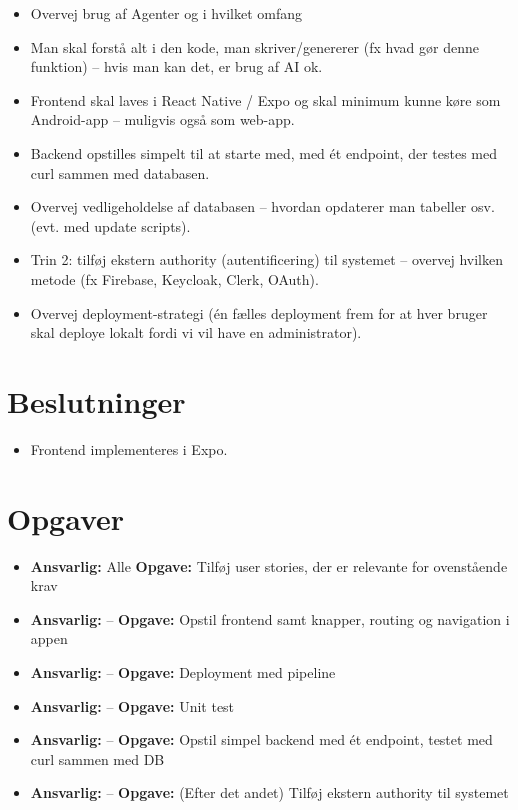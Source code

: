 \documentclass[a4paper,11pt]{article}
\begin{document}
\begin{itemize}
    \item Overvej brug af Agenter og i hvilket omfang
    \item Man skal forstå alt i den kode, man skriver/genererer (fx hvad gør denne funktion) -- hvis man kan det, er brug af AI ok.
    \item Frontend skal laves i React Native / Expo og skal minimum kunne køre som Android-app -- muligvis også som web-app.
    \item Backend opstilles simpelt til at starte med, med ét endpoint, der testes med curl sammen med databasen.
    \item Overvej vedligeholdelse af databasen -- hvordan opdaterer man tabeller osv. (evt. med update scripts).
    \item Trin 2: tilføj ekstern authority (autentificering) til systemet -- overvej hvilken metode (fx Firebase, Keycloak, Clerk, OAuth).
    \item Overvej deployment-strategi (én fælles deployment frem for at hver bruger skal deploye lokalt fordi vi vil have en administrator).
\end{itemize}

\section*{Beslutninger}

\begin{itemize}
    \item Frontend implementeres i Expo.
\end{itemize}

\section*{Opgaver}

\begin{itemize}
    \item \textbf{Ansvarlig:} Alle \textbf{Opgave:} Tilføj user stories, der er relevante for ovenstående krav
    \item \textbf{Ansvarlig:} -- \textbf{Opgave:} Opstil frontend samt knapper, routing og navigation i appen
    \item \textbf{Ansvarlig:} -- \textbf{Opgave:} Deployment med pipeline
    \item \textbf{Ansvarlig:} -- \textbf{Opgave:} Unit test
    \item \textbf{Ansvarlig:} -- \textbf{Opgave:} Opstil simpel backend med ét endpoint, testet med curl sammen med DB
    \item \textbf{Ansvarlig:} -- \textbf{Opgave:} (Efter det andet) Tilføj ekstern authority til systemet
\end{itemize}
\end{document}
